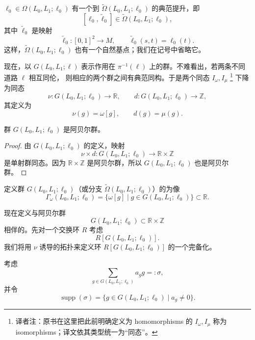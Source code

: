 $\ell_0\in\Omega(L_0,L_1;\ell_0)$ 有一个到
$\widetilde\Omega(L_0,L_1;\ell_0)$ 的典范提升，即
\[
  [\ell_0,\widetilde\ell_0]
  \in\widetilde\Omega(L_0,L_1;\ell_0),
\]
其中 $\widetilde\ell_0$ 是映射
\[
  \widetilde\ell_0:[0,1]^2\longrightarrow M,
  \qquad
  \widetilde\ell_0(s,t)=\ell_0(t).
\]
这样，$\widetilde\Omega(L_0,L_1;\ell_0)$ 也有一个自然基点；我们在记号中省略它。

现在，以 $G(L_0,L_1;\ell)$ 表示作用在 $\pi^{-1}(\ell)$ 上的\termDeckTransformation{}群。不难看出，若两条不同道路 $\ell$ 相互同伦，
则相应的两个群之间有典范同构。于是两个同态 $I_\omega,I_\mu$
\footnote{译者注：原书在这里把此前明确定义为 homomorphisms 的
$I_\omega,I_\mu$ 称为 isomorphisms；译文依其类型统一为“同态”。}
下降为同态
\[
  \nu:G(L_0,L_1;\ell_0)\longrightarrow\mathbb R,
  \qquad
  d:G(L_0,L_1;\ell_0)\longrightarrow\mathbb Z,
\]
其定义为
\begin{equation}
  \nu(g)=\omega[g],
  \qquad
  d(g)=\mu(g).
\label{eq:deck-area-degree-homomorphisms}
\end{equation}

\begin{proposition}
\label{prop:novikov-deck-group-abelian}
群 $G(L_0,L_1;\ell_0)$ 是阿贝尔群。
\end{proposition}

\begin{proof}
由 $G(L_0,L_1;\ell_0)$ 的定义，映射
\[
  \nu\times d:G(L_0,L_1;\ell_0)
  \longrightarrow\mathbb R\times\mathbb Z
\]
是单射群同态。因为 $\mathbb R\times\mathbb Z$ 是阿贝尔群，所以
$G(L_0,L_1;\ell_0)$ 也是阿贝尔群。
\end{proof}

\begin{definition}[周期群]
\label{def:lagrangian-period-group}
定义群 $G(L_0,L_1;\ell_0)$（或分支
$\widetilde\Omega(L_0,L_1;\ell_0)$）的\termPeriodGroup{}为像
\[
  \Gamma_\omega(L_0,L_1;\ell_0)
  =\{\omega[g]\mid g\in G(L_0,L_1;\ell_0)\}
  \subset\mathbb R.
\]
\end{definition}

现在定义与阿贝尔群
\[
  G(L_0,L_1;\ell_0)\subset\mathbb R\times\mathbb Z
\]
相伴的\termNovikovRing{}。先对一个交换环 $R$ 考虑\termGroupRing{}
\[
  R[G(L_0,L_1;\ell_0)].
\]
我们将用 $\nu$ 诱导的拓扑来定义环 $R[G(L_0,L_1;\ell_0)]$ 的一个完备化。

考虑\termFormalSum{}
\[
  \sum_{g\in G(L_0,L_1;\ell_0)}a_gg=: \sigma,
\]
并令
\[
  \operatorname{supp}(\sigma)
  =\{g\in G(L_0,L_1;\ell_0)\mid a_g\ne0\}.
\]

